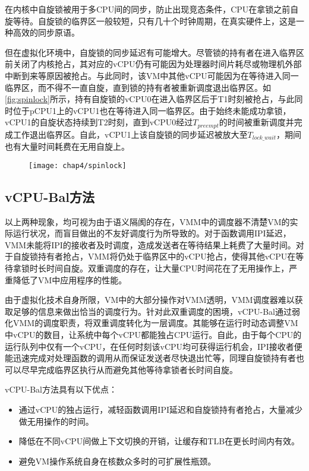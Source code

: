 在内核中自旋锁被用于多CPU间的同步，防止出现竞态条件，CPU在拿锁之前自旋等待。自旋锁的临界区一般较短，只有几十个时钟周期，在真实硬件上，这是一种高效的同步原语。

但在虚拟化环境中，自旋锁的同步延迟有可能增大。尽管锁的持有者在进入临界区前关闭了内核抢占，其对应的vCPU仍有可能因为处理器时间片耗尽或物理机外部中断到来等原因被抢占。与此同时，该VM中其他vCPU可能因为在等待进入同一临界区，而不得不一直自旋，直到锁的持有者被重新调度退出临界区。如\ref{fig:spinlock}所示，持有自旋锁的vCPU0在进入临界区后于T1时刻被抢占，与此同时位于pCPU1上的vCPU1也在等待进入同一临界区。由于始终未能成功拿锁，vCPU1的自旋状态持续到T2时刻，直到vCPU0经过$T_{preempt}$的时间被重新调度并完成工作退出临界区。自此，vCPU1上该自旋锁的同步延迟被放大至$T_{lock\_wait}$，期间也有大量时间耗费在无用自旋上。

\begin{figure}[!htp]
  \centering
  \texttt{[image: chap4/spinlock]}
\end{figure}

\subsection{vCPU-Bal方法}

以上两种现象，均可视为由于语义隔阂的存在，VMM中的调度器不清楚VM的实际运行状况，而盲目做出的不友好调度行为所导致的。对于函数调用IPI延迟，VMM未能将IPI的接收者及时调度，造成发送者在等待结果上耗费了大量时间。对于自旋锁持有者抢占，VMM将仍处于临界区中的vCPU抢占，使得其他vCPU在等待拿锁时长时间自旋。双重调度的存在，让大量CPU时间花在了无用操作上，严重降低了VM中应用程序的性能。

由于虚拟化技术自身所限，VM中的大部分操作对VMM透明，VMM调度器难以获取足够的信息来做出恰当的调度行为。针对此双重调度的困境，vCPU-Bal通过弱化VMM的调度职责，将双重调度转化为一层调度。其能够在运行时动态调整VM中vCPU的数目，让系统中每个vCPU都能独占CPU运行。自此，由于每个CPU的运行队列中仅有一个vCPU，在任何时刻该vCPU均可获得运行机会，IPI接收者便能迅速完成对处理函数的调用从而保证发送者尽快退出忙等，同理自旋锁持有者也可以尽早完成临界区执行从而避免其他等待拿锁者长时间自旋。

vCPU-Bal方法具有以下优点：

\begin{itemize}
\item{通过vCPU的独占运行，减轻函数调用IPI延迟和自旋锁持有者抢占，大量减少做无用操作的时间。}
\item{降低在不同vCPU间做上下文切换的开销，让缓存和TLB在更长时间内有效。}
\item{避免VM操作系统自身在核数众多时的可扩展性瓶颈。}
\end{itemize}



